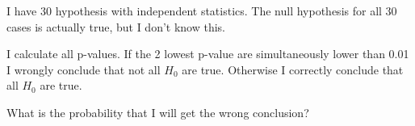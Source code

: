 
\begin{question}
I have 30 hypothesis with independent statistics. The null hypothesis for all 30
cases is actually true, but I don't know this.

I calculate all p-values.
If the 2 lowest p-value are simultaneously lower than 0.01 I wrongly conclude that not all \(H_0\) are true. Otherwise I correctly conclude that all \(H_0\) are true.

What is the probability that I will get the wrong conclusion?
\end{question}


